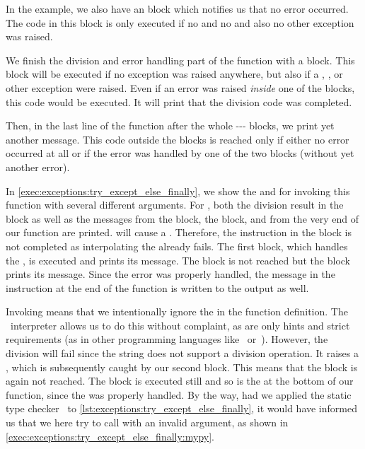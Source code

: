 In the example, we also have an  block which notifies us that no error occurred.
The code in this block is only executed if no  and no  and also no other exception was raised.

We finish the division and error handling part of the function with a  block.
This block will be executed if no exception was raised anywhere, but also if a , , or other exception were raised.
Even if an error was raised \emph{inside} one of the  blocks, this code would be executed.
It will print that the division code was completed.

Then, in the last line of the function after the whole --- blocks, we print yet another message.
This code outside the blocks is reached only if either no error occurred at all or if the error was handled by one of the two  blocks (without yet another error).

In \cref{exec:exceptions:try_except_else_finally}, we show the  and  for invoking this function with several different arguments.
For , both the division result in the  block as well as the messages from the  block, the  block, and from the very end of our function are printed.
 will cause a .
Therefore, the  instruction in the  block is not completed as interpolating the  already fails.
The first  block, which handles the , is executed and prints its message.
The  block is not reached but the  block prints its message.
Since the error was properly handled, the message in the  instruction at the end of the function is written to the output as well.

Invoking  means that we intentionally ignore the  in the function definition.
The \python\ interpreter allows us to do this without complaint, as  are only hints and strict requirements (as in other programming languages like~ or~).
However, the division  will fail since the string  does not support a division operation.
It raises a , which is subsequently caught by our second  block.
This means that the  block is again not reached.
The  block is executed still and so is the  at the bottom of our function, since the  was properly handled.
By the way, had we applied the static type checker \mypy\ to \cref{lst:exceptions:try_except_else_finally}, it would have informed us that we here try to call  with an invalid argument, as shown in \cref{exec:exceptions:try_except_else_finally:mypy}.

